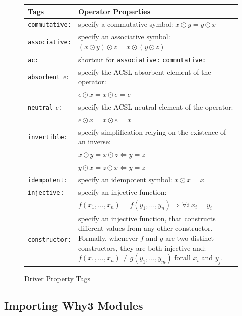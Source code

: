 \begin{figure}[htbp]
\begin{center}
  \begin{tabular}{lp{10cm}}
    \quad Tags & Operator Properties \\
    \hline
\texttt{commutative:} & specify a commutative symbol:
                        $x \odot y = y \odot x$ \\
\texttt{associative:} & specify an associative symbol:
                        $(x \odot y) \odot z = x \odot (y \odot z)$ \\
\texttt{ac:} & shortcut for \texttt{associative:} \texttt{commutative:} \\
\texttt{absorbent} \textit{e}\texttt{:} & specify the ACSL absorbent element of the operator: \\
                     & $e \odot x = x \odot e = e$ \\
\texttt{neutral} \textit{e}\texttt{:} & specify the ACSL neutral element of the operator: \\
                     &  $e \odot x = x \odot e = x$ \\
\texttt{invertible:} & specify simplification relying on the existence of an inverse: \\
                     &  $x \odot y = x \odot z \Longleftrightarrow y = z$ \\
                     &  $y \odot x = z \odot x \Longleftrightarrow y = z$ \\
\texttt{idempotent:} & specify an idempotent symbol: $x \odot x = x$ \\
\texttt{injective:} &  specify an injective function:\\
                      & $f(x_1,\ldots,x_n) = f(y_1,\ldots,y_n) \Longrightarrow \forall i \; x_i = y_i$ \\
\texttt{constructor:} & specify an injective function, that constructs different values
                        from any other constructor. Formally, whenever $f$ and $g$ are two
                        distinct constructors, they are both injective and:
                        $f(x_1,\ldots,x_n) \neq g(y_1,\ldots,y_m)$ forall $x_i$ and $y_j$. \\
\hline
\end{tabular}
\end{center}
\caption{Driver Property Tags}
\label{wp-driver-tags}
\end{figure}

\pagebreak
\subsection{Importing Why3 Modules}
\label{importer}


